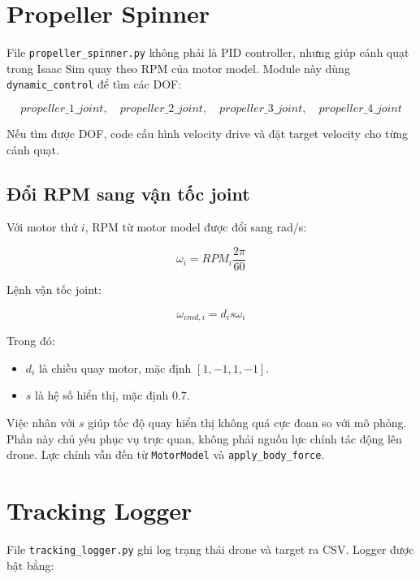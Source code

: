 \section{Propeller Spinner}

File \texttt{propeller\_spinner.py} không phải là PID controller, nhưng giúp
cánh quạt trong Isaac Sim quay theo RPM của motor model. Module này dùng
\texttt{dynamic\_control} để tìm các DOF:

\begin{equation}
    propeller\_1\_joint,\quad
    propeller\_2\_joint,\quad
    propeller\_3\_joint,\quad
    propeller\_4\_joint
\end{equation}

Nếu tìm được DOF, code cấu hình velocity drive và đặt target velocity cho từng
cánh quạt.

\subsection{Đổi RPM sang vận tốc joint}

Với motor thứ $i$, RPM từ motor model được đổi sang rad/s:

\begin{equation}
    \omega_i
    =
    RPM_i
    \frac{2\pi}{60}
\end{equation}

Lệnh vận tốc joint:

\begin{equation}
    \omega_{cmd,i}
    =
    d_i
    s
    \omega_i
\end{equation}

Trong đó:

\begin{itemize}
    \item $d_i$ là chiều quay motor, mặc định $[1,-1,1,-1]$.
    \item $s$ là hệ số hiển thị, mặc định $0.7$.
\end{itemize}

Việc nhân với $s$ giúp tốc độ quay hiển thị không quá cực đoan so với mô phỏng.
Phần này chủ yếu phục vụ trực quan, không phải nguồn lực chính tác động lên
drone. Lực chính vẫn đến từ \texttt{MotorModel} và
\texttt{apply\_body\_force}.

\section{Tracking Logger}

File \texttt{tracking\_logger.py} ghi log trạng thái drone và target ra CSV.
Logger được bật bằng:

